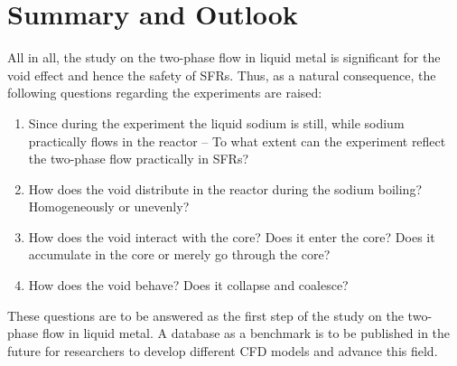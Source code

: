 \documentclass[11pt]{article}
\begin{document}
\section{Summary and Outlook}
All in all, the study on the two-phase flow in liquid metal is significant for the void effect and hence the safety of SFRs. Thus, as a natural consequence, the following questions regarding the experiments are raised: 

\begin{enumerate}
\item Since during the experiment the liquid sodium is still, while sodium practically flows in the reactor -- To what extent can the experiment reflect the two-phase flow practically in SFRs?

\item How does the void distribute in the reactor during the sodium boiling? Homogeneously or unevenly?

\item How does the void interact with the core? Does it enter the core? Does it accumulate in the core or merely go through the core?

\item How does the void behave? Does it collapse and coalesce?
\end{enumerate}

These questions are to be answered as the first step of the study on the two-phase flow in liquid metal. A database as a benchmark is to be published in the future for researchers to develop different CFD models and advance this field.



\end{document}
